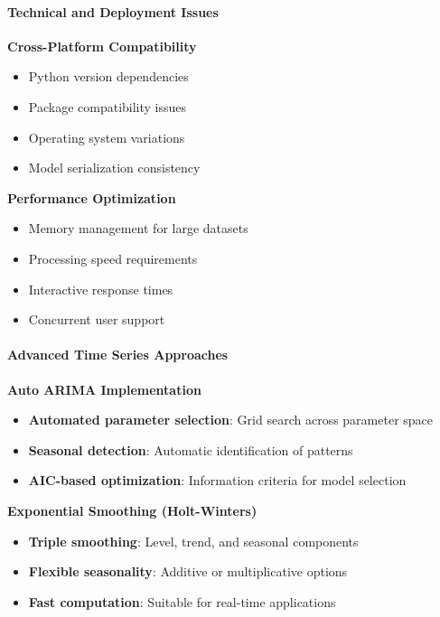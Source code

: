 {
	\framesubtitle{Technical and Deployment Issues}
	
	\begin{figure}[H]
		\centering
		
	\end{figure}
	\vspace{1cm}
	\textbf{Cross-Platform Compatibility}
	\begin{itemize}
		\item Python version dependencies
		\item Package compatibility issues
		\item Operating system variations
		\item Model serialization consistency
	\end{itemize}
	
	\textbf{Performance Optimization}
	\begin{itemize}
		\item Memory management for large datasets
		\item Processing speed requirements
		\item Interactive response times
		\item Concurrent user support
	\end{itemize}
}

{
	\framesubtitle{Advanced Time Series Approaches}
	
	\textbf{Auto ARIMA Implementation}
	\begin{itemize}
		\item \textbf{Automated parameter selection}: Grid search across parameter space
		\item \textbf{Seasonal detection}: Automatic identification of patterns
		\item \textbf{AIC-based optimization}: Information criteria for model selection
	\end{itemize}
	
	\textbf{Exponential Smoothing (Holt-Winters)}
	\begin{itemize}
		\item \textbf{Triple smoothing}: Level, trend, and seasonal components
		\item \textbf{Flexible seasonality}: Additive or multiplicative options
		\item \textbf{Fast computation}: Suitable for real-time applications
	\end{itemize}
	
		\begin{figure}[H]
		\centering
		
	\end{figure}
}

